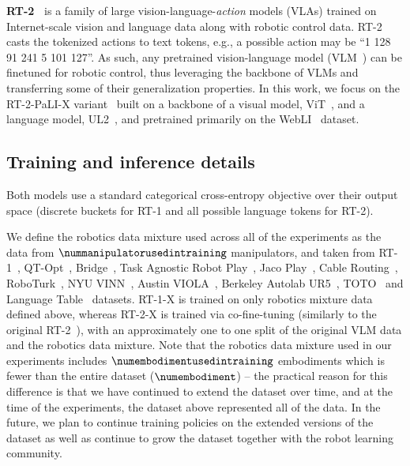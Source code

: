 \textbf{RT-2~\cite{brohan2023rt2}} is a family of large vision-language-\textit{action} models (VLAs) trained on Internet-scale vision and language data along with robotic control data. 
RT-2 casts the tokenized actions to text tokens, e.g., a possible action may be ``1 128 91 241 5 101 127''. 
As such, any pretrained vision-language model (VLM~\cite{chen2023palix, alayrac2022flamingo, driess2023palme}) can be finetuned for robotic control, thus leveraging the backbone of VLMs and transferring some of their generalization properties.
In this work, we focus on the RT-2-PaLI-X variant~\cite{chen2023palix} built on a backbone of a visual model, ViT~\cite{dosovitskiy2021image}, and a language model, UL2~\cite{tay2023ul2}, and pretrained primarily on the WebLI~\cite{chen2023palix} dataset.

\vspace{-0.1em}
\subsection{Training and inference details}
\vspace{-0.1em}
\label{sec:training_details}

Both models use a standard categorical cross-entropy objective over their output space (discrete buckets for RT-1 and all possible language tokens for RT-2). 

We define the robotics data mixture used across all of the experiments as the data from $\nummanipulatorusedintraining$ manipulators, and taken from RT-1~\cite{brohan2023rt1}, QT-Opt~\cite{kalashnikov2018qt}, Bridge~\cite{walke2023bridgedata}, Task Agnostic Robot Play~\cite{rosetebeas2022latent, mees2023grounding}, Jaco Play~\cite{dass2023jacoplay}, Cable Routing~\cite{luo2023multistage}, RoboTurk~\cite{DBLP:journals/corr/abs-1811-02790}, NYU VINN~\cite{pari2021surprising}, Austin VIOLA~\cite{zhu2023viola}, Berkeley Autolab UR5~\cite{BerkeleyUR5Website}, TOTO~\cite{zhou2023train} and Language Table~\cite{lynch2023interactive} datasets.
RT-1-X is trained on only robotics mixture data defined above, whereas RT-2-X is trained via co-fine-tuning (similarly to the original RT-2~\cite{brohan2023rt2}), with an approximately one to one split of the original VLM data and the robotics data mixture.
Note that the robotics data mixture used in our experiments includes $\numembodimentusedintraining$ embodiments which is fewer than the entire \repo dataset ($\numembodiment$) -- the practical reason for this difference is that we have continued to extend the dataset over time, and at the time of the experiments, the dataset above represented all of the data. In the future, we plan to continue training policies on the extended versions of the dataset as well as continue to grow the dataset together with the robot learning community.

